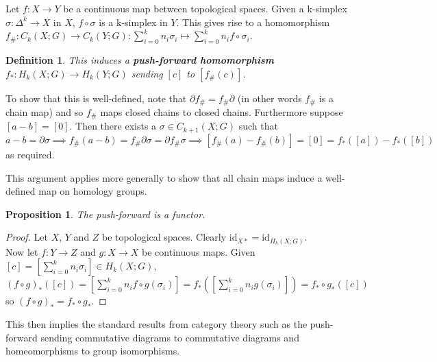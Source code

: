 \documentclass{report}
\newtheorem{definition}{Definition}
\newtheorem{proposition}{Proposition}
\begin{document}
\noindent Let $f\colon X\to Y$ be a continuous map between topological spaces. Given a k-simplex $\sigma\colon\Delta^k\to X$ in $X$, $f\circ\sigma$ is a k-simplex in $Y$. This gives rise to a homomorphism $f_\#\colon C_k(X;G)\to C_k(Y;G):\sum_{i=0}^kn_i\sigma_i\mapsto\sum_{i=0}^kn_if\circ\sigma_i$.
\begin{definition}
This induces a \textbf{push-forward homomorphism} $f_*\colon H_k(X;G)\to H_k(Y;G)$ sending $[c]$ to $[f_\#(c)]$.
\end{definition}
\noindent To show that this is well-defined, note that $\partial f_\#=f_\#\partial$ (in other words $f_\#$ is a chain map) and so $f_\#$ maps closed chains to closed chains. Furthermore suppose $[a-b]=[0]$. Then there exists a $\sigma\in C_{k+1}(X;G)$ such that $a-b=\partial\sigma\implies f_\#(a-b)=f_\#\partial\sigma=\partial f_\#\sigma\implies [f_\#(a)-f_\#(b)]=[0]=f_*([a])-f_*([b])$ as required.

\noindent This argument applies more generally to show that all chain maps induce a well-defined map on homology groups.

\begin{proposition}
The push-forward is a functor.
\end{proposition}
\begin{proof}
Let $X$, $Y$ and $Z$ be topological spaces.
Clearly $\text{id}_{X*}=\text{id}_{H_k(X;G)}$.\\
Now let $f\colon Y\to Z$ and $g\colon X\to X$ be continuous maps. Given $[c]=[\sum_{i=0}^kn_i\sigma_i]\in H_k(X;G)$, $(f\circ g)_*([c])=[\sum_{i=0}^kn_if\circ g(\sigma_i)]=f_*([\sum_{i=0}^kn_ig(\sigma_i)])=f_*\circ g_*([c])$ so $(f\circ g)_*=f_*\circ g_*$.
\end{proof}

\noindent This then implies the standard results from category theory such as the push-forward sending commutative diagrams to commutative diagrams and homeomorphisms to group isomorphisms.
\end{document}

